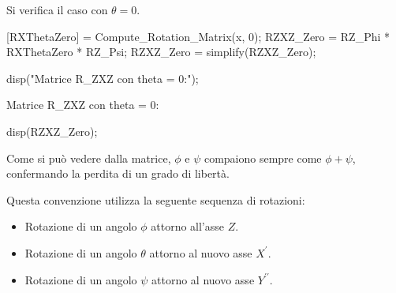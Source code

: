 \documentclass[11pt, a4paper]{article}
\begin{document}
\begin{par}
\begin{flushleft}
Si verifica il caso con $\theta =0$.
\end{flushleft}
\end{par}

\begin{matlabcode}
[RXThetaZero] = Compute_Rotation_Matrix(x, 0);
RZXZ_Zero = RZ_Phi * RXThetaZero * RZ_Psi;
RZXZ_Zero = simplify(RZXZ_Zero);

disp("Matrice R_ZXZ con theta = 0:");
\end{matlabcode}
\begin{matlaboutput}
Matrice R_ZXZ con theta = 0:
\end{matlaboutput}
\begin{matlabcode}
disp(RZXZ_Zero);
\end{matlabcode}

\begin{par}
\begin{flushleft}
Come si può vedere dalla matrice, $\phi$ e $\psi$ compaiono sempre come $\phi + \psi$, confermando la perdita di un grado di libertà.
\end{flushleft}
\end{par}

\newpage
{}

\begin{par}
\begin{flushleft}
Questa convenzione utilizza la seguente sequenza di rotazioni:
\end{flushleft}
\end{par}

\begin{itemize}
\setlength{\itemsep}{-1ex}
   \item{\begin{flushleft} Rotazione di un angolo $\phi$ attorno all'asse $Z$. \end{flushleft}}
   \item{\begin{flushleft} Rotazione di un angolo $\theta$ attorno al nuovo asse $X^{\prime }$. \end{flushleft}}
   \item{\begin{flushleft} Rotazione di un angolo $\psi$ attorno al nuovo asse $Y^{\prime \prime }$. \end{flushleft}}
\end{itemize}
\end{document}
